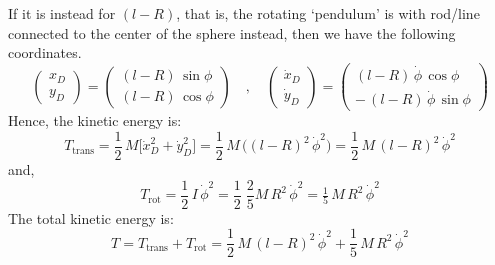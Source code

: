 If it is instead for $(l-R)$, that is, the rotating `pendulum' is with rod/line connected to the center of the sphere instead, then we have the following coordinates. 
\begin{equation}
\begin{pmatrix}
x_{D} \\ 
y_{D}
\end{pmatrix}
=
\begin{pmatrix}
(l - R)\,\sin\phi \\ 
(l - R)\,\cos\phi
\end{pmatrix}
\quad,\quad
\begin{pmatrix}
\dot{x}_{D} \\ 
\dot{y}_{D}
\end{pmatrix}
=
\begin{pmatrix}
(l - R)\,\dot{\phi}\,\cos\phi \\ 
-\, (l - R)\,\dot{\phi}\,\sin\phi
\end{pmatrix}
\end{equation}
Hence, the kinetic energy is:
\begin{equation}
T_{\text{trans}}
= \frac{1}{2}\,M\bigl[\dot{x}_{D}^{2} + \dot{y}_{D}^{2}\bigr]
= \frac{1}{2}\,M\,\bigl((l - R)^{2}\,\dot{\phi}^{2}\bigr)
= \frac{1}{2}\,M\,(l - R)^{2}\,\dot{\phi}^{2}
\end{equation}
and, 
\begin{equation}
T_{\text{rot}}
= \frac{1}{2}\,I\,\dot{\phi}^{2}
= \frac{1}{2}\;\frac{2}{5}M\,R^{2}\,\dot{\phi}^{2}
= \tfrac{1}{5}\,M\,R^{2}\,\dot{\phi}^{2}
\end{equation}
The total kinetic energy is:
\begin{equation}
T
= T_{\text{trans}} + T_{\text{rot}}
= \frac{1}{2}\,M\,(l - R)^{2}\,\dot{\phi}^{2}
+ \frac{1}{5}\,M\,R^{2}\,\dot{\phi}^{2}
\end{equation}
